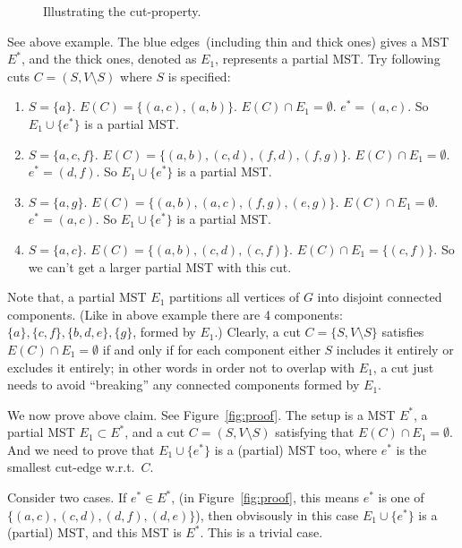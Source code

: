 \begin{figure}[h]
\centering{}
\caption{Illustrating the cut-property.}
\label{fig:spanning}
\end{figure}

See above example. The blue edges~(including thin and thick ones)
gives a MST $E^*$, and the thick ones, denoted as $E_1$, represents a partial MST.
Try following cuts $C = (S, V\setminus S)$ where $S$ is specified:
\vspace*{-\topsep}
\begin{enumerate}
\item $S = \{a\}$. $E(C) = \{(a,c), (a,b)\}$. $E(C) \cap E_1 = \emptyset$. $e^* = (a,c)$.
So $E_1\cup\{e^*\}$ is a partial MST.
\item $S = \{a,c,f\}$. $E(C) = \{(a,b), (c,d), (f,d), (f,g)\}$. $E(C) \cap E_1 = \emptyset$. $e^* = (d,f)$.
So $E_1\cup\{e^*\}$ is a partial MST.
\item $S = \{a,g\}$. $E(C) = \{(a,b), (a,c), (f,g), (e,g)\}$. $E(C) \cap E_1 = \emptyset$. $e^* = (a,c)$.
So $E_1\cup\{e^*\}$ is a partial MST.
\item $S = \{a,c\}$. $E(C) = \{(a,b), (c,d), (c,f)\}$. $E(C) \cap E_1 = \{(c,f)\}$. So we can't get a larger partial MST with this cut.
\end{enumerate}

Note that, a partial MST $E_1$ partitions all vertices of $G$ into disjoint connected components.
(Like in above example there are 4 components: $\{a\}, \{c,f\}, \{b,d,e\}, \{g\}$, formed by $E_1$.)
Clearly, a cut $C=\{S,V\setminus S\}$ satisfies $E(C) \cap E_1 = \emptyset$ if and only if for each component
either $S$ includes it entirely or excludes it entirely;
in other words in order not to overlap with $E_1$, a cut just needs to avoid ``breaking''
any connected components formed by $E_1$.

We now prove above claim.  See Figure~\ref{fig:proof}.
The setup is a MST $E^*$, a partial MST $E_1\subset E^*$,
and a cut $C = (S,V\setminus S)$ satisfying that $E(C)\cap E_1 = \emptyset$.
And we need to prove that $E_1\cup \{e^*\}$ is a (partial) MST too,
where $e^*$ is the smallest cut-edge w.r.t.\ $C$.

Consider two cases. If $e^* \in E^*$,
(in Figure~\ref{fig:proof}, this means $e^*$ is one of $\{(a,c),(c,d),(d,f),(d,e)\}$),
then obvisously in this case $E_1\cup \{e^*\}$ is a (partial) MST, and this MST is $E^*$.
This is a trivial case.

